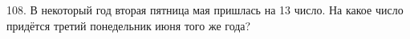 108. В некоторый год вторая пятница мая пришлась на 13 число. На какое число придётся третий понедельник июня того же года?\\
